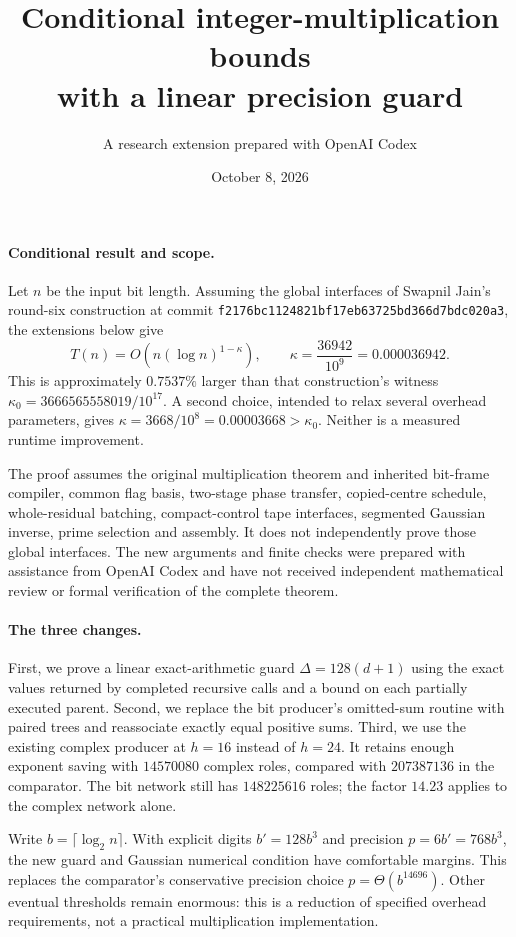\documentclass[11pt]{article}
\title{Conditional integer-multiplication bounds\\with a linear precision guard}
\author{A research extension prepared with OpenAI Codex}
\date{October 8, 2026}
\begin{document}
\maketitle
\paragraph{Conditional result and scope.}
Let $n$ be the input bit length. Assuming the global interfaces of
Swapnil Jain's round-six construction at commit
\texttt{f2176bc1124821bf17eb63725bd366d7bdc020a3}, the extensions below give
\[
 T(n)=O\!\left(n(\log n)^{1-\kappa}\right),\qquad
 \boxed{\kappa=\frac{36942}{10^9}=0.000036942.}
\]
This is approximately $0.7537\%$ larger than that construction's witness
$\kappa_0=3666565558019/10^{17}$. A second choice, intended to relax several
overhead parameters, gives $\kappa=3668/10^8=0.00003668>\kappa_0$.
Neither is a measured runtime improvement.

The proof assumes the original multiplication theorem and inherited
bit-frame compiler, common flag basis, two-stage phase transfer, copied-centre
schedule, whole-residual batching, compact-control tape interfaces, segmented
Gaussian inverse, prime selection and assembly. It does not independently
prove those global interfaces. The new arguments and finite checks were
prepared with assistance from OpenAI Codex and have not received independent
mathematical review or formal verification of the complete theorem.

\paragraph{The three changes.}
First, we prove a linear exact-arithmetic guard
$\Delta=128(d+1)$ using the exact values returned by completed recursive calls
and a bound on each partially executed parent. Second, we replace the bit
producer's omitted-sum routine with paired trees and reassociate exactly equal
positive sums. Third, we use the existing complex producer at $h=16$ instead
of $h=24$. It retains enough exponent saving with $14570080$ complex roles,
compared with $207387136$ in the comparator. The bit network still has
$148225616$ roles; the factor $14.23$ applies to the complex network alone.

Write $b=\lceil\log_2n\rceil$. With explicit digits $b'=128b^3$ and precision
$p=6b'=768b^3$, the new guard and Gaussian numerical condition have comfortable
margins. This replaces the comparator's conservative precision choice
$p=\Theta(b^{14696})$. Other eventual thresholds remain enormous: this is a
reduction of specified overhead requirements, not a practical multiplication
implementation.
\end{document}

